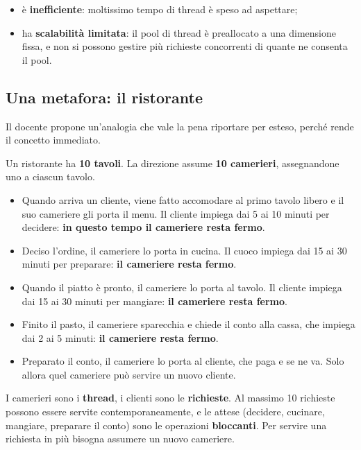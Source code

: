 \begin{itemize}
  \item è \textbf{inefficiente}: moltissimo tempo di thread è speso ad
        aspettare;
  \item ha \textbf{scalabilità limitata}: il pool di thread è preallocato a una
        dimensione fissa, e non si possono gestire più richieste concorrenti di
        quante ne consenta il pool.
\end{itemize}

\subsection{Una metafora: il ristorante}

Il docente propone un'analogia che vale la pena riportare per esteso, perché
rende il concetto immediato.

Un ristorante ha \textbf{10 tavoli}. La direzione assume \textbf{10 camerieri},
assegnandone uno a ciascun tavolo.

\begin{itemize}
  \item Quando arriva un cliente, viene fatto accomodare al primo tavolo libero
        e il suo cameriere gli porta il menu. Il cliente impiega dai 5 ai 10
        minuti per decidere: \textbf{in questo tempo il cameriere resta fermo}.
  \item Deciso l'ordine, il cameriere lo porta in cucina. Il cuoco impiega dai
        15 ai 30 minuti per preparare: \textbf{il cameriere resta fermo}.
  \item Quando il piatto è pronto, il cameriere lo porta al tavolo. Il cliente
        impiega dai 15 ai 30 minuti per mangiare: \textbf{il cameriere resta
        fermo}.
  \item Finito il pasto, il cameriere sparecchia e chiede il conto alla cassa,
        che impiega dai 2 ai 5 minuti: \textbf{il cameriere resta fermo}.
  \item Preparato il conto, il cameriere lo porta al cliente, che paga e se ne
        va. Solo allora quel cameriere può servire un nuovo cliente.
\end{itemize}

I camerieri sono i \textbf{thread}, i clienti sono le \textbf{richieste}. Al
massimo 10 richieste possono essere servite contemporaneamente, e le attese
(decidere, cucinare, mangiare, preparare il conto) sono le operazioni
\textbf{bloccanti}. Per servire una richiesta in più bisogna assumere un nuovo
cameriere.


